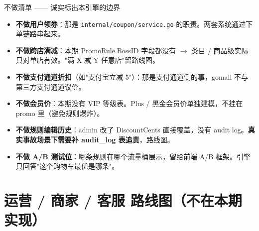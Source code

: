 \documentclass[aspectratio=169,11pt]{beamer}
\begin{document}
\begin{frame}[shrink]{不做清单 —— 诚实标出本引擎的边界}
\begin{itemize}
  \item \textbf{不做用户领券}：那是 \texttt{internal/coupon/service.go} 的职责。两套系统通过下单链路串起来。
  \item \textbf{不做跨店满减}：本期 PromoRule.BossID 字段都没有 $\to$ 类目 / 商品级实际只对单店有效。"满 X 减 Y 任意店"留路线图。
  \item \textbf{不做支付通道折扣}（如"支付宝立减 5"）：那是支付通道侧的事，gomall 不与第三方支付通道议价。
  \item \textbf{不做会员价}：本期没有 VIP 等级表。Plus / 黑金会员价单独建模，不挂在 promo 里（避免规则爆炸）。
  \item \textbf{不做规则编辑历史}：admin 改了 DiscountCents 直接覆盖，没有 audit log。\textbf{真实事故场景下需要补 audit\_log 表追责}，路线图。
  \item \textbf{不做 A/B 测试位}：哪条规则在哪个流量桶展示，留给前端 A/B 框架。引擎只回答"这个购物车最优是哪条"。
\end{itemize}
\end{frame}

\section{运营 / 商家 / 客服 路线图（不在本期实现）}
\end{document}
